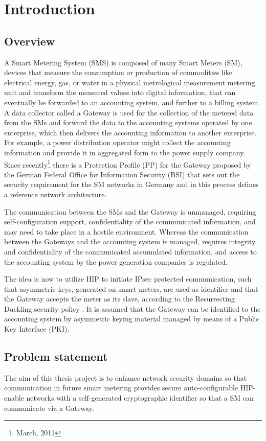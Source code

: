 \chapter{Introduction}
\section{Overview}
A Smart Metering System (SMS) is composed of many Smart Meters (SM), devices that measure the consumption or production of commodities like electrical energy, gas, or water in a physical metrological measurement metering unit and transform the measured values into digital information, that can eventually be forwarded to an accounting system, and further to a billing system. A data collector  called a Gateway is used for the collection of the metered data from the SMs and  forward the data to the accounting systems operated by one enterprise, which then delivers the accounting information to another enterprise. For example, a power distribution operator  might collect the accounting information and provide it in aggregated form to the power supply company. Since recently\footnote{March, 2011} there is a Protection Profile (PP) for the Gateway proposed by the German Federal Office for Information Security (BSI) \cite{BSI_pp} that sets out the security requirement for the SM networks in Germany and in this process defines a reference network architecture.

The communication between the SMs and the Gateway is unmanaged, requiring self-configuration support, confidentiality of the communicated information, and may need to take place in a hostile environment. Whereas the communication between the Gateways and the accounting system is managed, requires integrity and confidentiality of the communicated accumulated information, and access to the accounting system by the power generation companies is regulated.

The idea is now to utilize HIP \cite{HIP_rfc} to initiate IPsec protected communication, such that asymmetric keys, generated on smart meters, are used as identifier and that the Gateway accepts the meter as its slave, according to the Resurrecting Duckling security policy \cite{Sta_duck}. It is assumed that the Gateway can be identified to the accounting system by asymmetric keying material managed by means of a Public Key Interface (PKI).

\section{Problem statement}
The aim of this thesis project is to  enhance network security domains so that communication in future smart metering provides secure auto-configurable HIP-enable networks with  a self-generated cryptographic identifier so that a SM can communicate via a Gateway.

